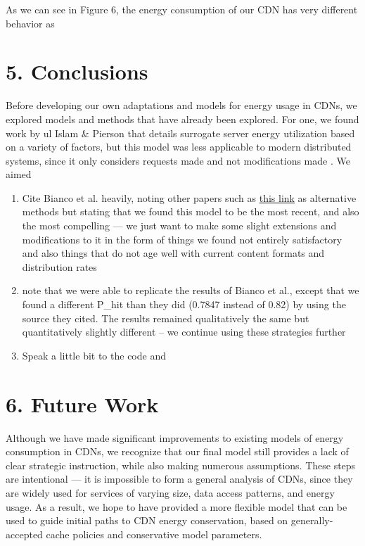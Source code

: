 \documentclass[
	a4paper, %
	10pt, %
	unnumberedsections, %
	twoside, %
]{LTJournalArticle}
\begin{document}
As we can see in Figure 6, the energy consumption of our CDN has very different behavior as 

\section{5. Conclusions}

Before developing our own adaptations and models for energy usage in CDNs, we explored models and methods that have already been explored. For one, we found work by ul Islam \& Pierson that details surrogate server energy utilization based on a variety of factors, but this model was less applicable to modern distributed systems, since it only considers requests made and not modifications made \cite{ulIslam2012}. We aimed
\begin{enumerate}
    \item Cite Bianco et al. heavily, noting other papers such as \href{https://link.springer.com/chapter/10.1007/978-3-642-32606-6\_6}{this link} as alternative methods but stating that we found this model to be the most recent, and also the most compelling --- we just want to make some slight extensions and modifications to it in the form of things we found not entirely satisfactory and also things that do not age well with current content formats and distribution rates
    \item note that we were able to replicate the results of Bianco et al., except that we found a different P\_hit than they did (0.7847 instead of 0.82) by using the source they cited. The results remained qualitatively the same but quantitatively slightly different -- we continue using these strategies further
    \item Speak a little bit to the code and
\end{enumerate}

\section{6. Future Work}
Although we have made significant improvements to existing models of energy consumption in CDNs, we recognize that our final model still provides a lack of clear strategic instruction, while also making numerous assumptions. These steps are intentional --- it is impossible to form a general analysis of CDNs, since they are widely used for services of varying size, data access patterns, and energy usage. As a result, we hope to have provided a more flexible model that can be used to guide initial paths to CDN energy conservation, based on generally-accepted cache policies and conservative model parameters. 
\end{document}
